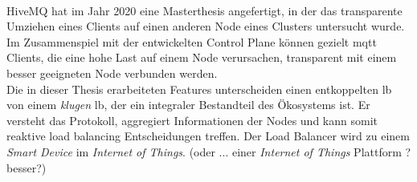 \\
HiveMQ hat im Jahr 2020 eine Masterthesis angefertigt, in der das transparente Umziehen eines Clients auf einen anderen Node eines Clusters untersucht wurde. Im Zusammenspiel mit der entwickelten Control Plane können gezielt \ac{mqtt} Clients, die eine hohe Last auf einem Node verursachen, transparent mit einem besser geeigneten Node verbunden werden.
\\
Die in dieser Thesis erarbeiteten Features unterscheiden einen entkoppelten \acl{lb} von einem \textit{klugen} \acl{lb}, der ein integraler Bestandteil des Ökosystems ist. Er versteht das Protokoll, aggregiert Informationen der Nodes und kann somit reaktive load balancing Entscheidungen treffen. Der Load Balancer wird zu einem \textit{Smart Device} im \textit{Internet of Things}. (oder ... einer \textit{Internet of Things} Plattform ? besser?)

\begin{comment}
Aus diesen Untersuchungen sind beispielsweise die Testszenarien aus Kapitel \ref{ss:test} entstanden, die zeigen sollen, dass bestimmte Verhaltensmuster der Clients eine ungleiche Lastverteilung im Cluster erzeugen können. Bei der Implementierung dieser Szenarien ist aufgefallen, wie komplex und unterschiedlich die Verhaltensmuster sein können.
Unterschiedliche Client Verhaltensmuster führen jedoch nicht grundsätzlich direkt zu einem Problem bei der Lastverteilung. Es ist die Kombination von unterschiedlichen Clients mit der Eigenschaft, dass \ac{mqtt} ein zustandsbehaftetes und verbindungsorientiertes Protokoll ist.
Der \acl{lb} kann nicht, wie zum Beispiel bei \ac{http}, einzelne Anfragen eines Clients an verschiedene Nodes schicken. Sobald ein Client verbunden ist, muss der Zielnode alle Anfragen des Clients bearbeiten, bis dieser die Verbindung beendet.
In der Realität will man dieses Verhalten bei \ac{http} oftmals gezielt erzwingen, um beispielsweise schnellere Antwortzeiten durch Cache-Speicher zu erzielen. Bei \ac{http} kann der \acl{lb} jedoch Pakete transparent zum Client an einen anderen Node schicken, wenn zum Beispiel der bisherige Zielnode überlastet ist. Bei \ac{mqtt} hat der \acl{lb} gar keine Möglichkeit die Last eines Clients nach dem Verbindungsaufbau zu steuern.
Dies untermauert die Relevanz der load balancing Entscheidung bei \ac{mqtt}.
\end{comment}

\begin{comment}

ausblick:
- extension die clients abschie{\ss}en kann
  - member einer shared subscription können immer abeschossen werden
- session roaming
- stateless

vielleicht:
- konzeptuell multiplexing

- man kann auch probleme bei clients lösen -> aber nicht alles
- load balancer unterstützt die steuerbarkeit

\end{comment}
